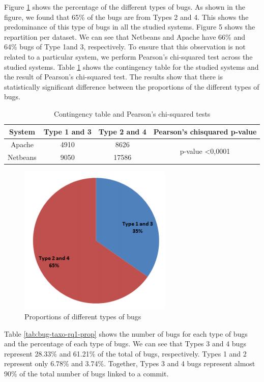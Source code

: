 Figure \ref{fig:bug-taxo-rq1} shows the percentage of the different types of
bugs. As shown in the figure, we found that 65\% of the bugs
are from Types 2 and 4. This shows the predominance of this
type of bugs in all the studied systems. Figure 5 shows the
repartition per dataset. We can see that Netbeans and Apache
have 66\% and 64\% bugs of Type 1and 3, respectively. To
ensure that this observation is not related to a particular
system, we perform Pearson’s chi-squared test across the
studied systems. Table \ref{tab:bug-taxo-rq1} shows the contingency table for the
studied systems and the result of Pearson’s chi-squared test.
The results show that there is statistically significant
difference between the proportions of the different types of
bugs.

\begin{table}[h!]
\centering
\begin{tabular}{c|c|c|c}
{System} & {Type 1 and 3} & {Type 2 and 4} & {Pearson’s chisquared p-value}        \\  \hline \hline
Apache       & 4910               & 8626               & \multirow{2}{*}{p-value \textless 0,0001} \\ \cline{1-3}
Netbeans     & 9050               & 17586              & \\ \hline \hline
\end{tabular}
\caption{Contingency table and Pearson's chi-squared tests\label{tab:bug-taxo-rq1}}
\end{table}

\begin{figure}[h!]
  \centering
    \includegraphics[scale=0.7]{media/bug-taxo-rq1.png}
    \caption{Proportions of different types of bugs
    \label{fig:bug-taxo-rq1}}
\end{figure}

Table \ref{tab:bug-taxo-rq1-prop} shows the number of bugs for each type of bugs
and the percentage of each type of bugs. We can see that
Types 3 and 4 bugs represent 28.33\% and 61.21\% of the total
of bugs, respectively. Types 1 and 2 represent only 6.78\% and
3.74\%. Together, Types 3 and 4 bugs represent almost 90\%
of the total number of bugs linked to a commit.


